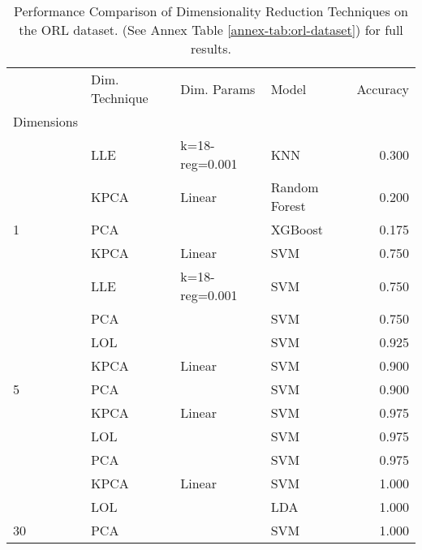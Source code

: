 \begin{table}[!h]
    \begin{tabular}{llllr}
        \toprule
        {}                                       & Dim. Technique & Dim. Params    & Model         & Accuracy \\
        Dimensions                               &                &                &               &          \\
        \midrule
                                                 & LLE            & k=18-reg=0.001 & KNN           & 0.300    \\
                                                 & KPCA           & Linear         & Random Forest & 0.200    \\
        \multirow{-3}{*}{1}                      & PCA            &                & XGBoost       & 0.175    \\
        \rowcolor{lightgray}                     & KPCA           & Linear         & SVM           & 0.750    \\
        \rowcolor{lightgray}                     & LLE            & k=18-reg=0.001 & SVM           & 0.750    \\
        \rowcolor{lightgray}\multirow{-3}{*}{3}  & PCA            &                & SVM           & 0.750    \\
                                                 & LOL            &                & SVM           & 0.925    \\
                                                 & KPCA           & Linear         & SVM           & 0.900    \\
        \multirow{-3}{*}{5}                      & PCA            &                & SVM           & 0.900    \\
        \rowcolor{lightgray}                     & KPCA           & Linear         & SVM           & 0.975    \\
        \rowcolor{lightgray}                     & LOL            &                & SVM           & 0.975    \\
        \rowcolor{lightgray}\multirow{-3}{*}{15} & PCA            &                & SVM           & 0.975    \\
                                                 & KPCA           & Linear         & SVM           & 1.000    \\
                                                 & LOL            &                & LDA           & 1.000    \\
        \multirow{-3}{*}{30}                     & PCA            &                & SVM           & 1.000    \\
        \bottomrule
    \end{tabular}
    \caption{Performance Comparison of Dimensionality Reduction Techniques on the ORL dataset. (See Annex Table \ref{annex-tab:orl-dataset}) for full results.}
    \label{tab:orl-dataset}
\end{table}

